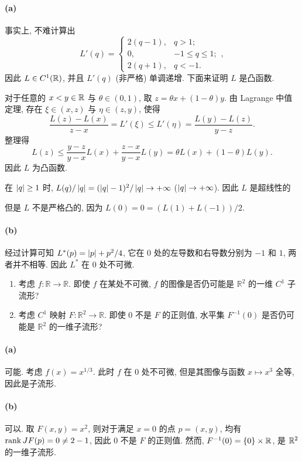 \documentclass{article}
\begin{document}
\begin{solution}
	\paragraph{(a)} 事实上, 不难计算出
	\[ L'(q) = \begin{cases}
		2(q-1), & q>1; \\
		0, & -1 \le q \le 1; \\
		2(q+1), & q<-1.
	\end{cases}, \]
	因此 $L \in C^1(\mathbb{R})$, 并且 $L'(q)$ (非严格) 单调递增. 下面来证明 $L$ 是凸函数.

	对于任意的 $x < y \in \mathbb{R}$ 与 $\theta \in (0,1)$, 取 $z = \theta x + (1-\theta) y$. 由 Lagrange 中值定理, 存在 $\xi \in (x,z)$ 与 $\eta \in (z,y)$, 使得
	\[ \frac{L(z) - L(x)}{z-x} = L'(\xi) \le L'(\eta) = \frac{L(y) - L(z)}{y-z}. \]
	整理得
	\[ L(z) \le \frac{y-z}{y-x} L(x) + \frac{z-x}{y-x} L(y) = \theta L(x) + (1-\theta) L(y). \]
	因此 $L$ 为凸函数.

	在 $\left|q\right| \ge 1$ 时, $L(q)/\left|q\right| = (\left|q\right|-1)^{2}/\left|q\right| \to +\infty$ ($\left|q\right| \to +\infty$). 因此 $L$ 是超线性的

	但是 $L$ 不是严格凸的, 因为 $L(0) = 0 = (L(1) + L(-1))/2$. 

	\paragraph{(b)} 经过计算可知 $L^*(p) = \left|p\right| + p^2/4$, 它在 $0$ 处的左导数和右导数分别为 $-1$ 和 $1$, 两者并不相等. 因此 $L^*$ 在 $0$ 处不可微.
\end{solution}



\begin{problem}
  \begin{enumerate}
    \item[(a)] 考虑 $f:\mathbb{R}\to\mathbb{R}$. 即使 $f$ 在某处不可微, $f$ 的图像是否仍可能是 $\mathbb{R}^2$ 的一维 $C^1$ 子流形?
    \item[(b)] 考虑 $C^1$ 映射 $F:\mathbb{R}^2\to\mathbb{R}$. 即使 $0$ 不是 $F$ 的正则值, 水平集 $F^{-1}(0)$ 是否仍可能是 $\mathbb{R}^2$ 的一维子流形?
  \end{enumerate}
\end{problem}

\begin{solution}
	\paragraph{(a)} 可能. 考虑 $f(x) = x^{1/3}$. 此时 $f$ 在 $0$ 处不可微, 但是其图像与函数 $x \mapsto x^3$ 全等, 因此是子流形.

	\paragraph{(b)} 可以. 取 $F(x,y) = x^2$, 则对于满足 $x=0$ 的点 $p = (x,y)$, 均有 $\operatorname{rank} JF(p) = 0 \neq 2-1$, 因此 $0$ 不是 $F$ 的正则值. 然而, $F^{-1}(0) = \{0\} \times \mathbb{R}$, 是 $\mathbb{R}^2$ 的一维子流形.
\end{solution}
\end{document}
